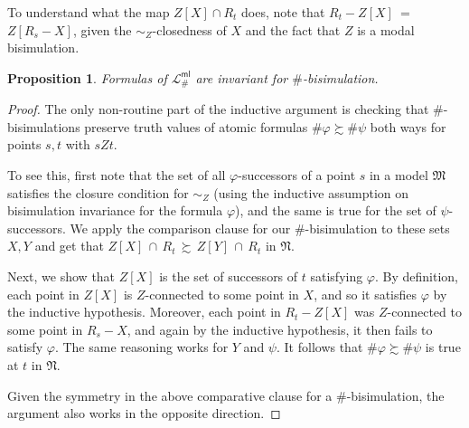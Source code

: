 \documentclass[12pt,oneside,reqno]{amsart}
\newtheorem{proposition}{Proposition}
\theoremstyle{definition}
\begin{document}
To understand what the map $Z[X] \cap R_t$ does, note that  $R_t - Z[X]$\, =\, $Z[R_s -X]$, given the $\sim_Z$-closedness of $X$ and the fact that $Z$ is a modal bisimulation. 
\begin{proposition} Formulas of $\mathcal{L}_\#^{\mathsf{ml}}$ are invariant for $\#$-bisimulation.
\end{proposition}
\begin{proof} The only non-routine part of the inductive argument is checking that $\#$-bisimulations preserve truth values of atomic formulas $\#\varphi \succsim \#\psi$ both ways for points $s, t$ with $s Z t$. 

To see this, first note that the set of all $\varphi$-successors of a point $s$ in a model $\mathfrak{M}$ satisfies the closure condition for $\sim_Z$ (using the inductive assumption on bisimulation invariance for the formula $\varphi$), and the same is true for the set of $\psi$-successors. We apply the comparison clause for our $\#$-bisimulation to these sets $X, Y$ and get that $Z[X] \, \cap \, R_t\, \succsim \,Z[Y] \,\cap \, R_t$ in $\mathfrak{N}$. 

Next, we show that $Z[X]$ is the set of successors of $t$ satisfying  $ \varphi$. By definition, each point in $Z[X]$ is $Z$-connected to some point in $X$, and so it satisfies $\varphi$ by the inductive hypothesis. Moreover, each point in $R_t - Z[X]$ was $Z$-connected to some point in $R_s - X$, and again by the inductive hypothesis, it then fails to satisfy $\varphi$. The same reasoning works for $Y$ and $\psi$. It follows that $\#\varphi \succsim \#\psi$ is true at $t$ in $\mathfrak{N}$.

Given the symmetry in the above comparative clause for a $\#$-bisimulation, the argument also works in the opposite direction.
\end{proof}
\end{document}
